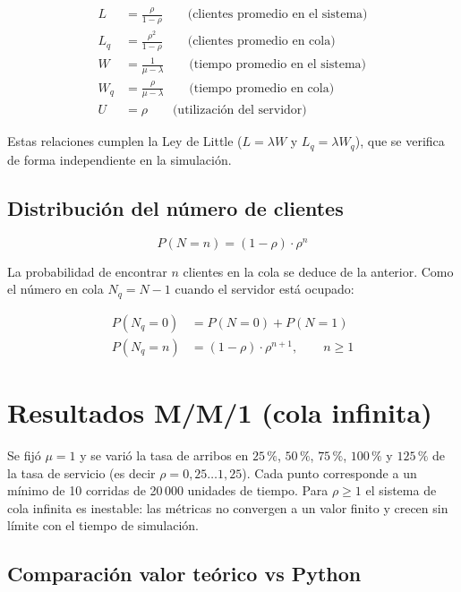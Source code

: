 \documentclass{article}
\begin{document}
\begin{align}
    L &= \frac{\rho}{1-\rho} \qquad \text{(clientes promedio en el sistema)} \\
    L_q &= \frac{\rho^2}{1-\rho} \qquad \text{(clientes promedio en cola)} \\
    W &= \frac{1}{\mu-\lambda} \qquad \text{(tiempo promedio en el sistema)} \\
    W_q &= \frac{\rho}{\mu-\lambda} \qquad \text{(tiempo promedio en cola)} \\
    U &= \rho \qquad \text{(utilización del servidor)}
\end{align}

Estas relaciones cumplen la Ley de Little ($L=\lambda W$ y $L_q = \lambda
W_q$), que se verifica de forma independiente en la simulación.

\subsection{Distribución del número de clientes}

\begin{equation}
    P(N=n) = (1-\rho)\cdot \rho^n
\end{equation}

La probabilidad de encontrar $n$ clientes en la cola se deduce de la
anterior. Como el número en cola $N_q = N-1$ cuando el servidor está
ocupado:

\begin{align}
    P(N_q=0) &= P(N=0) + P(N=1) \\
    P(N_q=n) &= (1-\rho)\cdot\rho^{n+1}, \qquad n \geq 1
\end{align}

\section{Resultados M/M/1 (cola infinita)}

Se fijó $\mu=1$ y se varió la tasa de arribos en $25\,\%$, $50\,\%$,
$75\,\%$, $100\,\%$ y $125\,\%$ de la tasa de servicio (es decir $\rho =
0{,}25 \ldots 1{,}25$). Cada punto corresponde a un mínimo de 10 corridas de
20\,000 unidades de tiempo. Para $\rho \geq 1$
el sistema de cola infinita es inestable: las métricas no convergen a un
valor finito y crecen sin límite con el tiempo de simulación.

\subsection{Comparación valor teórico vs Python}
\end{document}
